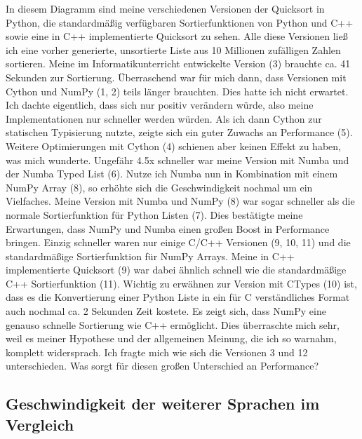 \documentclass[11pt,a4paper]{article}
\begin{document}
In diesem Diagramm sind meine verschiedenen Versionen der Quicksort in Python,
die standardmäßig verfügbaren Sortierfunktionen von Python und C++
sowie eine in C++ implementierte Quicksort zu sehen.
Alle diese Versionen ließ ich eine vorher generierte, unsortierte Liste aus
10 Millionen zufälligen Zahlen sortieren.
Meine im Informatikunterricht entwickelte Version (3) brauchte ca. 41 Sekunden
zur Sortierung. Überraschend war für mich dann, dass Versionen mit Cython und NumPy
(1, 2) teils länger brauchten. Dies hatte ich nicht erwartet. Ich dachte eigentlich,
dass sich nur positiv verändern würde, also meine Implementationen nur schneller werden
würden. Als ich dann Cython zur statischen Typisierung nutzte, zeigte sich ein
guter Zuwachs an Performance (5). Weitere Optimierungen mit Cython (4)
schienen aber keinen Effekt zu haben, was mich wunderte.
Ungefähr 4.5x schneller war meine Version mit Numba und der Numba Typed List (6).
Nutze ich Numba nun in Kombination mit einem NumPy Array (8), so erhöhte sich
die Geschwindigkeit nochmal um ein Vielfaches.
Meine Version mit Numba und NumPy (8) war sogar schneller als die normale
Sortierfunktion für Python Listen (7). Dies bestätigte meine Erwartungen,
dass NumPy und Numba einen großen Boost in Performance bringen.
Einzig schneller waren nur einige C/C++ Versionen (9, 10, 11) und die
standardmäßige Sortierfunktion für NumPy Arrays.
Meine in C++ implementierte Quicksort (9) war dabei ähnlich schnell
wie die standardmäßige C++ Sortierfunktion (11).
Wichtig zu erwähnen zur Version mit CTypes (10) ist, dass es die Konvertierung
einer Python Liste in ein für C verständliches Format auch nochmal ca. 2 Sekunden
Zeit kostete.
Es zeigt sich, dass NumPy eine genauso schnelle Sortierung wie C++ ermöglicht.
Dies überraschte mich sehr, weil es meiner Hypothese und der allgemeinen Meinung,
die ich so warnahm, komplett widersprach.
Ich fragte mich wie sich die Versionen 3 und 12 unterschieden.
Was sorgt für diesen großen Unterschied an Performance?

\subsection{Geschwindigkeit der weiterer Sprachen im Vergleich}
\end{document}
